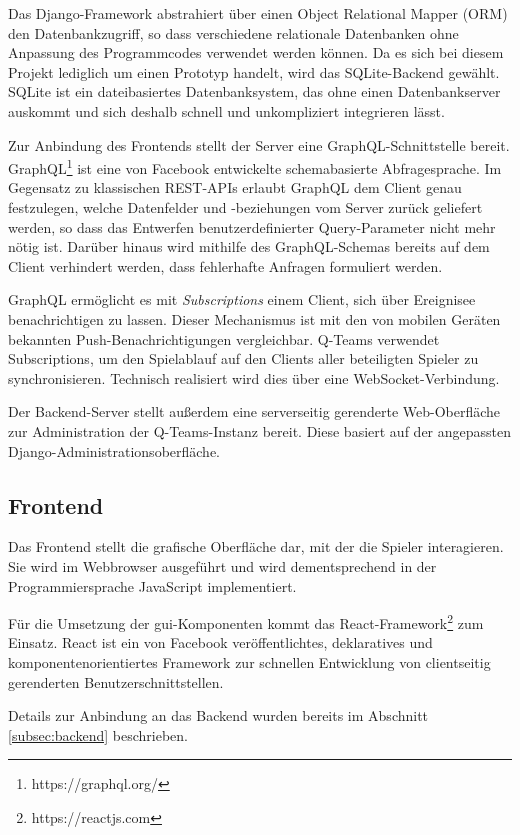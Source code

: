 \documentclass[a4paper,11pt,listof=numbered,glossary=totoc,parskip=half,toc=bib]{scrreprt}
\begin{document}
	Das Django-Framework abstrahiert über einen Object Relational Mapper (ORM) den Datenbankzugriff, so dass verschiedene relationale Datenbanken ohne Anpassung des Programmcodes verwendet werden können. Da es sich bei diesem Projekt lediglich um einen Prototyp handelt, wird das SQLite-Backend gewählt. SQLite ist ein dateibasiertes Datenbanksystem, das ohne einen Datenbankserver auskommt und sich deshalb schnell und unkompliziert integrieren lässt.
	
	Zur Anbindung des Frontends stellt der Server eine GraphQL-Schnittstelle bereit. GraphQL\footnote{https://graphql.org/} ist eine von Facebook entwickelte schemabasierte Abfragesprache. Im Gegensatz zu klassischen REST-APIs erlaubt GraphQL dem Client genau festzulegen, welche Datenfelder und -beziehungen vom Server zurück geliefert werden, so dass das Entwerfen benutzerdefinierter Query-Parameter nicht mehr nötig ist. Darüber hinaus wird mithilfe des GraphQL-Schemas bereits auf dem Client verhindert werden, dass fehlerhafte Anfragen formuliert werden.
	
	GraphQL ermöglicht es mit \textit{Subscriptions} einem Client, sich über Ereignisee benachrichtigen zu lassen. Dieser Mechanismus ist mit den von mobilen Geräten bekannten Push-Benachrichtigungen vergleichbar. Q-Teams verwendet Subscriptions, um den Spielablauf auf den Clients aller beteiligten Spieler zu synchronisieren. Technisch realisiert wird dies über eine WebSocket-Verbindung.

	Der Backend-Server stellt außerdem eine serverseitig gerenderte Web-Oberfläche zur Administration der Q-Teams-Instanz bereit. Diese basiert auf der angepassten Django-Administrationsoberfläche.
	
	\subsection{Frontend}
	Das Frontend stellt die grafische Oberfläche dar, mit der die Spieler interagieren. Sie wird im Webbrowser ausgeführt und wird dementsprechend in der Programmiersprache JavaScript implementiert.
	
	 Für die Umsetzung der \Gls{gui}-Komponenten kommt das React-Framework\footnote{https://reactjs.com} zum Einsatz. React ist ein von Facebook veröffentlichtes, deklaratives und komponentenorientiertes Framework zur schnellen Entwicklung von clientseitig gerenderten Benutzerschnittstellen.
	
	Details zur Anbindung an das Backend wurden bereits im Abschnitt \ref{subsec:backend} beschrieben.
\end{document}
